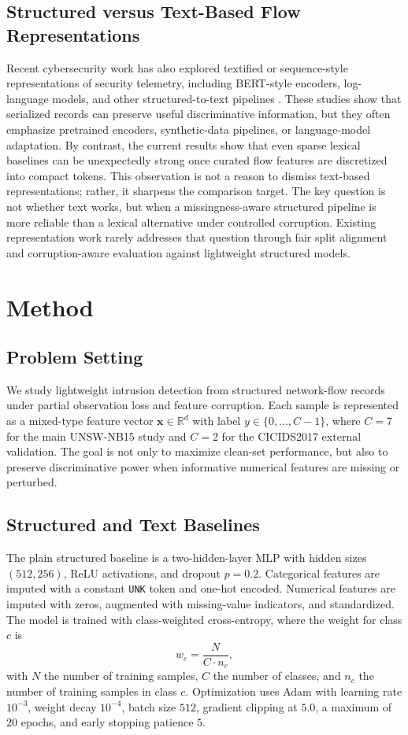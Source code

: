 \subsection{Structured versus Text-Based Flow Representations}
Recent cybersecurity work has also explored textified or sequence-style representations of security telemetry, including BERT-style encoders, log-language models, and other structured-to-text pipelines \cite{textified_security_telemetry,bert_for_ids,llm_for_security_telemetry}. These studies show that serialized records can preserve useful discriminative information, but they often emphasize pretrained encoders, synthetic-data pipelines, or language-model adaptation. By contrast, the current results show that even sparse lexical baselines can be unexpectedly strong once curated flow features are discretized into compact tokens. This observation is not a reason to dismiss text-based representations; rather, it sharpens the comparison target. The key question is not whether text works, but when a missingness-aware structured pipeline is more reliable than a lexical alternative under controlled corruption. Existing representation work rarely addresses that question through fair split alignment and corruption-aware evaluation against lightweight structured models.

\section{Method}
\subsection{Problem Setting}
We study lightweight intrusion detection from structured network-flow records under partial observation loss and feature corruption. Each sample is represented as a mixed-type feature vector $\mathbf{x}\in\mathbb{R}^{d}$ with label $y \in \{0,\dots,C-1\}$, where $C=7$ for the main UNSW-NB15 study and $C=2$ for the CICIDS2017 external validation. The goal is not only to maximize clean-set performance, but also to preserve discriminative power when informative numerical features are missing or perturbed.

\subsection{Structured and Text Baselines}
The plain structured baseline is a two-hidden-layer MLP with hidden sizes $(512,256)$, ReLU activations, and dropout $p=0.2$. Categorical features are imputed with a constant \texttt{UNK} token and one-hot encoded. Numerical features are imputed with zeros, augmented with missing-value indicators, and standardized. The model is trained with class-weighted cross-entropy, where the weight for class $c$ is
\[
w_c = \frac{N}{C \cdot n_c},
\]
with $N$ the number of training samples, $C$ the number of classes, and $n_c$ the number of training samples in class $c$. Optimization uses Adam with learning rate $10^{-3}$, weight decay $10^{-4}$, batch size $512$, gradient clipping at $5.0$, a maximum of $20$ epochs, and early stopping patience $5$.

